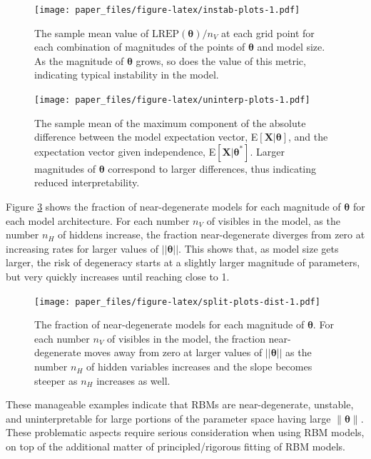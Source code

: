\documentclass[AMS,STIX1COL]{WileyNJD-v2}
\newcommand{\nv}{{n_{\scriptscriptstyle V}}}
\newcommand{\nh}{{n_{\scriptscriptstyle H}}}
\begin{document}
\begin{figure}
\centering
\texttt{[image: paper\_files/figure-latex/instab-plots-1.pdf]}
\caption{\label{fig:instab-plots}The sample mean value of
\(\text{LREP}(\boldsymbol \theta)/\nv\) at each grid point for each
combination of magnitudes of the points of \(\boldsymbol \theta\) and
model size. As the magnitude of \(\boldsymbol \theta\) grows, so does
the value of this metric, indicating typical instability in the model.}
\end{figure}

\begin{figure}
\centering
\texttt{[image: paper\_files/figure-latex/uninterp-plots-1.pdf]}
\caption{\label{fig:uninterp-plots}The sample mean of the maximum
component of the absolute difference between the model expectation
vector, E\(\left[\boldsymbol X | \boldsymbol \theta\right]\), and the
expectation vector given independence,
E\(\left[\boldsymbol X | \boldsymbol \theta^* \right ]\). Larger
magnitudes of \(\boldsymbol \theta\) correspond to larger differences,
thus indicating reduced interpretability.}
\end{figure}

Figure \ref{fig:split-plots-dist} shows the fraction of near-degenerate
models for each magnitude of \(\boldsymbol \theta\) for each model
architecture. For each number \(\nv\) of visibles in the model, as the
number \(\nh\) of hiddens increase, the fraction near-degenerate
diverges from zero at increasing rates for larger values of
\(||\boldsymbol \theta||\). This shows that, as model size gets larger,
the risk of degeneracy starts at a slightly larger magnitude of
parameters, but very quickly increases until reaching close to 1.

\par

\begin{figure}
\centering
\texttt{[image: paper\_files/figure-latex/split-plots-dist-1.pdf]}
\caption{\label{fig:split-plots-dist}The fraction of near-degenerate
models for each magnitude of \(\boldsymbol \theta\). For each number
\(\nv\) of visibles in the model, the fraction near-degenerate moves
away from zero at larger values of \(||\boldsymbol \theta||\) as the
number \(\nh\) of hidden variables increases and the slope becomes
steeper as \(\nh\) increases as well.}
\end{figure}

These manageable examples indicate that RBMs are near-degenerate,
unstable, and uninterpretable for large portions of the parameter space
having large \(\|\boldsymbol \theta\|\). These problematic aspects
require serious consideration when using RBM models, on top of the
additional matter of principled/rigorous fitting of RBM models.
\end{document}
